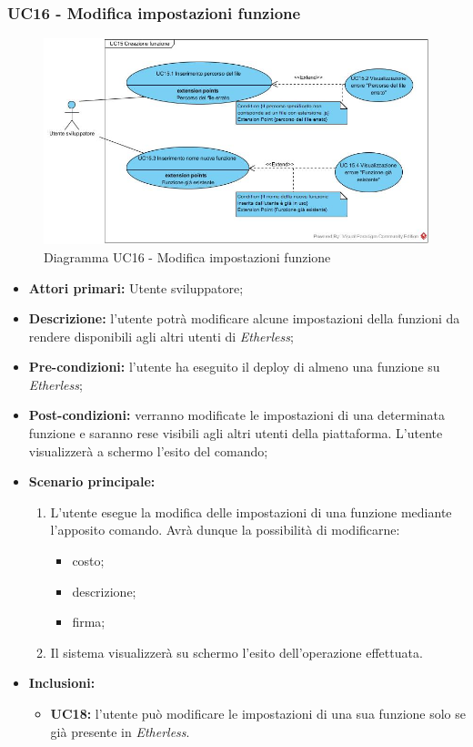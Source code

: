 \subsubsection{UC16 - Modifica impostazioni funzione}
\begin{figure}[h]
	\centering
	\includegraphics[width=\linewidth]{res/img/UC15.jpg}
	\caption{Diagramma UC16 - Modifica impostazioni funzione}
\end{figure}
\begin{itemize}
	\item \textbf{Attori primari:} Utente sviluppatore;
	\item \textbf{Descrizione:} l'utente potrà modificare alcune impostazioni della funzioni da rendere disponibili agli altri utenti di \textit{Etherless}; 
	\item \textbf{Pre-condizioni:} l'utente ha eseguito il deploy di almeno una funzione su \textit{Etherless};
	\item \textbf{Post-condizioni:} verranno modificate le impostazioni di una determinata funzione e saranno rese visibili agli altri utenti della piattaforma. L'utente visualizzerà a schermo l'esito del comando;
	\item \textbf{Scenario principale:} 
	\begin{enumerate}
		\item L'utente esegue la modifica delle impostazioni di una funzione mediante l'apposito comando. Avrà dunque la possibilità di modificarne:
		\begin{itemize}
			\item costo;
			\item descrizione;
			\item firma;
		\end{itemize}
		\item Il sistema visualizzerà su schermo l'esito dell'operazione effettuata.
	\end{enumerate}
	\item \textbf{Inclusioni:} 
	\begin{itemize}
		\item \textbf{UC18:} l'utente può modificare le impostazioni di una sua funzione solo se già presente in \textit{Etherless}.
	\end{itemize}	
\end{itemize}